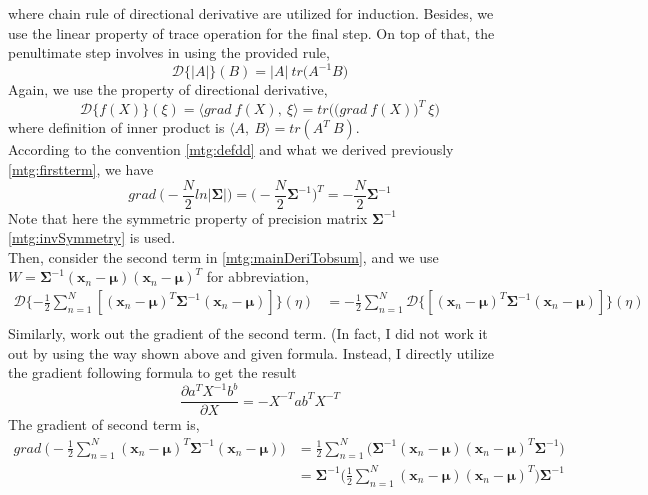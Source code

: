 \documentclass[11pt,a4paper]{article}
\newcommand{\htab}{\hspace*{0.63cm}}
\newcommand{\dd}[2]{\mathcal{D}\{ #1 \} (#2)}
\newcommand{\bmu}{\boldsymbol{\mu}}
\newcommand{\bsum}{\boldsymbol{\Sigma}}
\newcommand{\xnv}{\boldsymbol{x}_{n} }
\begin{document}
\htab where chain rule of directional derivative are utilized for induction. Besides, we use the linear property of trace operation for the final step. On top of that, the penultimate step involves in using the provided rule, 
    \begin{equation} 
        \dd{|A|}{B} = |A|\ tr \big(A^{-1} B\big)
    \end{equation}
\htab Again, we use the property of directional derivative,
    \begin{equation} \label{mtg:defdd}
        \dd{f(X)}{\xi} = \langle grad\ f(X),\ \xi  \rangle = tr \Big( \big(grad\ f(X)\big)^{T}\ \xi \Big)
    \end{equation}
\htab where definition of inner product is $\langle A,\ B\rangle = tr (A^{T}\ B)$. \\
\htab According to the convention \eqref{mtg:defdd} and what we derived previously \eqref{mtg:firstterm}, we have
    \begin{equation}
        grad\ \Big(- \frac{N}{2} ln|\bsum|\Big) = \Big(-\frac{N}{2} \bsum^{-1}\Big)^{T} = -\frac{N}{2} \bsum^{-1}
    \end{equation}
\htab Note that here the symmetric property of precision matrix $\bsum^{-1}$ \eqref{mtg:invSymmetry} is used.\\
\htab Then, consider the second term in \eqref{mtg:mainDeriTobsum}, and we use $ W = \bsum^{-1} (\xnv-\bmu) (\xnv-\bmu)^{T} $ for abbreviation,
        \begin{align}
        \dd{-\frac{1}{2} \sum_{n=1}^{N} [ (\xnv-\bmu)^{T} \bsum^{-1} (\xnv-\bmu)]}{\eta}
        & = -\frac{1}{2} \sum_{n=1}^{N} \dd{[ (\xnv-\bmu)^{T} \bsum^{-1} (\xnv-\bmu)]}{\eta} \\
        \end{align}
\htab Similarly, work out the gradient of the second term. (In fact, I did not work it out by using the way shown above and given formula. Instead, I directly utilize the gradient following formula to get the result
    $$\frac{\partial a^{T}X^{-1}b^{b}}{\partial X}= -X^{-T}ab^{T}X^{-T}$$
\htab The gradient of second term is,
    \begin{align}
         grad \ \Big( -\frac{1}{2} \sum_{n=1}^{N}  (\xnv-\bmu)^{T} \bsum^{-1} (\xnv-\bmu) \Big) 
        &    = \frac{1}{2} \sum_{n=1}^{N} \big( \bsum^{-1} (\xnv-\bmu) (\xnv-\bmu)^{T} \bsum^{-1} \big) \\
        &   = \bsum^{-1} \Big( \frac{1}{2} \sum_{n=1}^{N}  (\xnv-\bmu) (\xnv-\bmu)^{T}  \Big) \bsum^{-1}
    \end{align}
\end{document}

